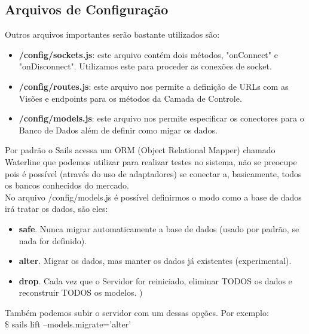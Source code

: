 \documentclass[a4paper,11pt]{article}
\begin{document}
\subsection{Arquivos de Configuração}
Outros arquivos importantes serão bastante utilizados são:
\begin{itemize}
  \item \textbf{/config/sockets.js}: este arquivo contém dois métodos, "onConnect" e "onDisconnect". Utilizamos este para proceder as conexões de socket.
  \item \textbf{/config/routes.js}: este arquivo nos permite a definição de URLs com as Visões e endpoints para os métodos da Camada de Controle.
  \item \textbf{/config/models.js}: este arquivo nos permite especificar os conectores para o Banco de Dados além de definir como migar os dados.
\end{itemize}
Por padrão o Sails acessa um ORM (Object Relational Mapper) chamado Waterline que podemos utilizar para realizar testes no sistema, não se preocupe pois é possível (através do uso de adaptadores) se conectar a, basicamente, todos os bancos conhecidos do mercado. \\[3mm]
No arquivo /config/models.js é possível definirmos o modo como a base de dados irá tratar os dados, são eles:
\begin{itemize}
  \item \textbf{safe}. Nunca migrar automaticamente a base de dados (usado por padrão, se nada for definido).
  \item \textbf{alter}. Migrar os dados, mas manter os dados já existentes (experimental).
  \item \textbf{drop}. Cada vez que o Servidor for reiniciado, eliminar TODOS os dados e reconstruir TODOS os modelos.
)
\end{itemize}
Também podemos subir o servidor com um dessas opções. Por exemplo: \\[1mm]
{\ttfamily\$ sails lift --models.migrate='alter'}
 
\end{document}
